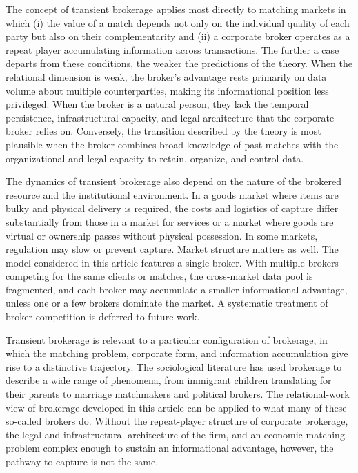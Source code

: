 \documentclass[
]{article}
\begin{document}
The concept of transient brokerage applies most directly to matching markets in which (i) the value of a match depends not only on the individual quality of each party but also on their complementarity and (ii) a corporate broker operates as a repeat player accumulating information across transactions. The further a case departs from these conditions, the weaker the predictions of the theory. When the relational dimension is weak, the broker's advantage rests primarily on data volume about multiple counterparties, making its informational position less privileged. When the broker is a natural person, they lack the temporal persistence, infrastructural capacity, and legal architecture that the corporate broker relies on. Conversely, the transition described by the theory is most plausible when the broker combines broad knowledge of past matches with the organizational and legal capacity to retain, organize, and control data.

The dynamics of transient brokerage also depend on the nature of the brokered resource and the institutional environment. In a goods market where items are bulky and physical delivery is required, the costs and logistics of capture differ substantially from those in a market for services or a market where goods are virtual or ownership passes without physical possession. In some markets, regulation may slow or prevent capture. Market structure matters as well. The model considered in this article features a single broker. With multiple brokers competing for the same clients or matches, the cross-market data pool is fragmented, and each broker may accumulate a smaller informational advantage, unless one or a few brokers dominate the market. A systematic treatment of broker competition is deferred to future work.

Transient brokerage is relevant to a particular configuration of brokerage, in which the matching problem, corporate form, and information accumulation give rise to a distinctive trajectory. The sociological literature has used brokerage to describe a wide range of phenomena, from immigrant children translating for their parents to marriage matchmakers and political brokers. The relational-work view of brokerage developed in this article can be applied to what many of these so-called brokers do. Without the repeat-player structure of corporate brokerage, the legal and infrastructural architecture of the firm, and an economic matching problem complex enough to sustain an informational advantage, however, the pathway to capture is not the same.
\end{document}
